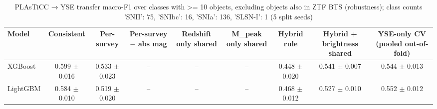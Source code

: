 \begin{table}
\centering
\caption{PLAsTiCC → YSE transfer macro-F1 over classes with >= 10 objects, excluding objects also in ZTF BTS (robustness); class counts {'SNII': 75, 'SNIbc': 16, 'SNIa': 136, 'SLSN-I': 1} (5 split seeds)}
\begin{tabular}{lcccccccc}
\hline
Model & Consistent & Per-survey & Per-survey $-$ abs mag & Redshift only shared & M\_peak only shared & Hybrid rule & Hybrid + brightness shared & YSE-only CV (pooled out-of-fold) \\
\hline
XGBoost & 0.599 $\pm$ 0.016 & 0.533 $\pm$ 0.023 & -- & -- & -- & 0.448 $\pm$ 0.020 & 0.541 $\pm$ 0.007 & 0.544 $\pm$ 0.013 \\
LightGBM & 0.584 $\pm$ 0.010 & 0.519 $\pm$ 0.020 & -- & -- & -- & 0.468 $\pm$ 0.012 & 0.527 $\pm$ 0.010 & 0.552 $\pm$ 0.012 \\
\hline
\end{tabular}
\end{table}
